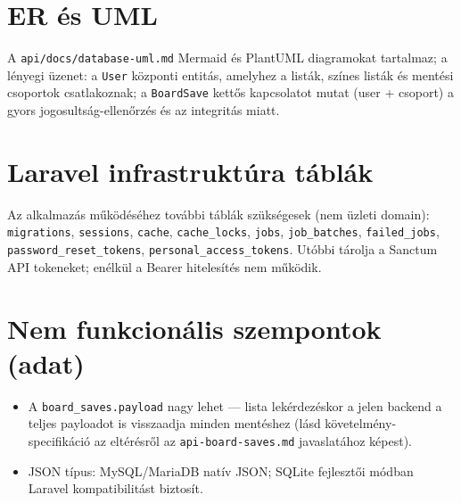 \section{ER és UML}
A \texttt{api/docs/database-uml.md} Mermaid és PlantUML diagramokat tartalmaz; a lényegi üzenet: a \texttt{User} központi entitás, amelyhez a listák, színes listák és mentési csoportok csatlakoznak; a \texttt{BoardSave} kettős kapcsolatot mutat (user + csoport) a gyors jogosultság-ellenőrzés és az integritás miatt.

\section{Laravel infrastruktúra táblák}
Az alkalmazás működéséhez további táblák szükségesek (nem üzleti domain):
\texttt{migrations}, \texttt{sessions}, \texttt{cache}, \texttt{cache\_locks}, \texttt{jobs}, \texttt{job\_batches}, \texttt{failed\_jobs}, \texttt{password\_reset\_tokens}, \texttt{personal\_access\_tokens}.
Utóbbi tárolja a Sanctum API tokeneket; enélkül a Bearer hitelesítés nem működik.

\section{Nem funkcionális szempontok (adat)}
\begin{itemize}
  \item A \texttt{board\_saves.payload} nagy lehet — lista lekérdezéskor a jelen backend a teljes payloadot is visszaadja minden mentéshez (lásd követelmény-specifikáció az eltérésről az \texttt{api-board-saves.md} javaslatához képest).
  \item JSON típus: MySQL/MariaDB natív JSON; SQLite fejlesztői módban Laravel kompatibilitást biztosít.
\end{itemize}
